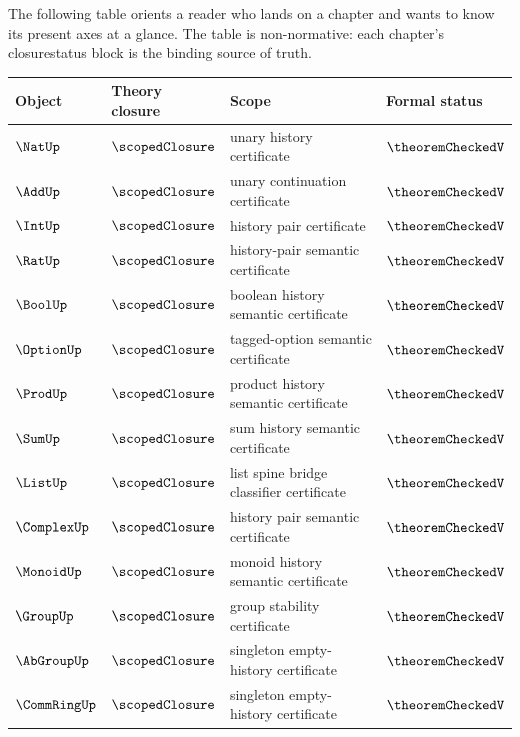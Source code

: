 The following table orients a reader who lands on a chapter and wants to know its present axes at a glance. The table is non-normative: each chapter's closurestatus block is the binding source of truth.

\begin{longtable}{p{}p{}p{}p{}}
\toprule
\textbf{Object} & \textbf{Theory closure} & \textbf{Scope} & \textbf{Formal status}\\
\midrule
\endhead
$\NatUp$         & $\scopedClosure$ & unary history certificate                                & $\theoremCheckedV$\\
$\AddUp$         & $\scopedClosure$ & unary continuation certificate                           & $\theoremCheckedV$\\
$\IntUp$         & $\scopedClosure$ & history pair certificate                                 & $\theoremCheckedV$\\
$\RatUp$         & $\scopedClosure$ & history-pair semantic certificate                        & $\theoremCheckedV$\\
$\BoolUp$        & $\scopedClosure$ & boolean history semantic certificate                     & $\theoremCheckedV$\\
$\OptionUp$      & $\scopedClosure$ & tagged-option semantic certificate                       & $\theoremCheckedV$\\
$\ProdUp$        & $\scopedClosure$ & product history semantic certificate                     & $\theoremCheckedV$\\
$\SumUp$         & $\scopedClosure$ & sum history semantic certificate                         & $\theoremCheckedV$\\
$\ListUp$        & $\scopedClosure$ & list spine bridge classifier certificate                 & $\theoremCheckedV$\\
$\ComplexUp$     & $\scopedClosure$ & history pair semantic certificate                        & $\theoremCheckedV$\\
$\MonoidUp$      & $\scopedClosure$ & monoid history semantic certificate                      & $\theoremCheckedV$\\
$\GroupUp$       & $\scopedClosure$ & group stability certificate                              & $\theoremCheckedV$\\
$\AbGroupUp$     & $\scopedClosure$ & singleton empty-history certificate                      & $\theoremCheckedV$\\
$\CommRingUp$    & $\scopedClosure$ & singleton empty-history certificate                      & $\theoremCheckedV$\\

\end{longtable}
